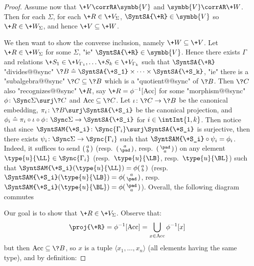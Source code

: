 \begin{proof}
	 Assume now that $\+V \corrRA \symbb{V}$
	and $\symbb{V} \corrAR \+W$. Then for each $\Sigma$, for each $\+R \in \+V_{\Sigma}$,
	$\SyntSA{\+R} \in \symbb{V}$ so $\+R \in \+W_{\Sigma}$, and hence $\+V \subseteq \+W$.

	We then want to show the converse inclusion, namely $\+W \subseteq \+V$. Let $\+R \in \+W_{\Sigma}$ for some $\Sigma$, "ie" $\SyntSA{\+R} \in \symbb{V}$.
	Hence there exists $\Gamma$ and relations $\+S_1 \in \+V_{\Gamma_1}, \dotsc \+S_k \in \+V_{\Gamma_k}$
	such that $\SyntSA{\+R}$ "divides@@sync"
	$\?B \defeq \SyntSA{\+S_1} \times \cdots \times \SyntSA{\+S_k}$,
	"ie" there is a "subalgebra@@sync" $\?C \subseteq \?B$ which is a "quotient@@sync" of $\?B$.
	Then $\?C$ also "recognizes@@sync" $\+R$, say $\+R = \phi^{-1}[\Acc]$ for some
	"morphism@@sync" $\phi\colon \Sync\Sigma \surj \?C$ and $\Acc \subseteq \?C$.
	Let $\iota\colon \?C \to \?B$ be the canonical embedding,
	$\pi_i\colon \?B \surj \SyntSA{\+S_i}$ be the canonical projection,
	and $\phi_i \defeq \pi_i \circ \iota \circ \phi\colon \Sync\Sigma \to \SyntSA{\+S_i}$
	for $i \in \intInt{1,k}$. Then notice that since $\SyntSAM{\+S_i}\colon \Sync{\Gamma_i} \surj \SyntSA{\+S_i}$ is surjective, then there exists $\psi_i \colon \Sync\Sigma \to \Sync{\Gamma_i}$ such that $\SyntSAM{\+S_i} \circ \psi_i = \phi_i$. Indeed, it suffices
	to send $\pair{a}{b}$ (resp.~$\pair{a}{\pad}$, resp.~$\pair{\pad}{a}$)
	on any element $\type{u}{\LL} \in \Sync{\Gamma_i}$ (resp.~$\type{u}{\LB}$,
	resp.~$\type{u}{\BL}$) such that $\SyntSAM{\+S_i}(\type{u}{\LL}) = \phi\pair{a}{b}$
	(resp.~$\SyntSAM{\+S_i}(\type{u}{\LB}) = \phi\pair{a}{\pad}$,
	resp.~$\SyntSAM{\+S_i}(\type{u}{\BL}) = \phi\pair{\pad}{a}$). Overall, the following diagram
	commutes
	\begin{center}
	\end{center}
	Our goal is to show that $\+R \in \+V_{\Sigma}$. Observe that:
	\[
		\proj{\+R} =
		\phi^{-1}[\Acc] = \bigcup_{x \in \Acc} \phi^{-1}[x]
	\]
	but then $\Acc \subseteq \?B$, so $x$ is a tuple $\langle x_1, \dotsc, x_n \rangle$
	(all elements having the same type), and by definition:

\end{proof}
